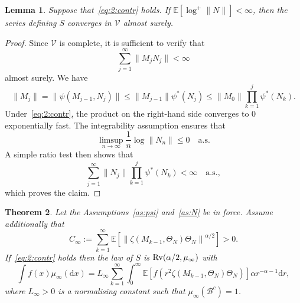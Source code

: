 \documentclass[preprint,12pt]{elsarticle}
\newtheorem{thm}{Theorem}[section]
\newtheorem{lem}[thm]{Lemma}
\theoremstyle{definition}
\theoremstyle{remark}
\newcommand{\Mbf}{{ M}}
\newcommand{\Nbf}{{ N}}
\newcommand{\Sbf}{{ S}}
\newcommand{\1}{{\mathbf 1}}
\numberwithin{equation}{section}
\newcommand{\Ebb}{\mathbb{E}}  %
\newcommand{\Rvrm}{{\rm Rv}}
\newcommand{\Vcal}{\mathcal{V}}
\newcommand{\Bcal}{\mathcal{B}}
\begin{document}
  \begin{lem}
    Suppose that~\eqref{eq:2:contr} holds. If 
    $\mathbb{E}[\log^+\|\Nbf\|]<\infty$, then the series defining $\Sbf$ 
    converges in $\Vcal$ almost surely.
  \end{lem}

  \begin{proof}
    Since $\Vcal$ is complete, it is sufficient to verify that
    \begin{equation*}
      \sum_{j=1}^\infty \|\Mbf_j \Nbf_j\| <\infty
    \end{equation*}
    almost surely. We have
    \begin{equation}\label{eq:4:estM}
      \|\Mbf_j\| = \|\psi(\Mbf_{j-1}, \Nbf_j)\| \leq 
      \|\Mbf_{j-1}\| \psi^*(\Nbf_j) 
      \leq \|\Mbf_0\| \prod_{k=1}^{j} \psi^*(\Nbf_k).
    \end{equation}
    Under~\eqref{eq:2:contr}, the product on the right-hand side converges 
    to $0$ exponentially fast. The integrability assumption ensures that
    \begin{equation*}
      \limsup_{n \to \infty} \frac{1}{n} \log \|\Nbf_n\| \leq 0 
      \quad \text{a.s.}
    \end{equation*}
    A simple ratio test then shows that
    \begin{equation*}
      \sum_{j=1}^\infty \|\Nbf_j\| 
      \prod_{k=1}^{j} \psi^*(\Nbf_k)<\infty
      \quad \text{a.s.},
    \end{equation*}
    which proves the claim.
  \end{proof}


\begin{thm}\label{thm:2:RCLM1}
	Let the Assumptions~\ref{as:psi} and~\ref{as:N} be in force. Assume additionally that
    \begin{equation*}\label{eq:nondegenerate-limit}
      C_\infty
      :=
      \sum_{k=1}^\infty
      \Ebb\left[
        \left\|
          \zeta(\Mbf_{k-1},\Theta_\Nbf)\Theta_\Nbf
        \right\|^{\alpha/2}
      \right]
      >0.
    \end{equation*}
	If~\eqref{eq:2:contr} holds then
	the law of $\Sbf$ is $\Rvrm(\alpha/2, \mu_\infty)$ with
	\begin{equation*}
    		\int f\left( x \right)\mu_\infty(\mathrm{d}x)
		= L_\infty
        \sum_{k=1}^\infty 
		\int_0^\infty\Ebb\left[f\left(r^2  \zeta(\Mbf_{k-1}, \Theta_\Nbf)\Theta_\Nbf\right)\right] \alpha r^{-\alpha -1}\mathrm{d}r,
	\end{equation*}
	where $L_\infty>0$ is a normalising constant such that $\mu_\infty(\Bcal^c)=1$.
\end{thm}
\end{document}

